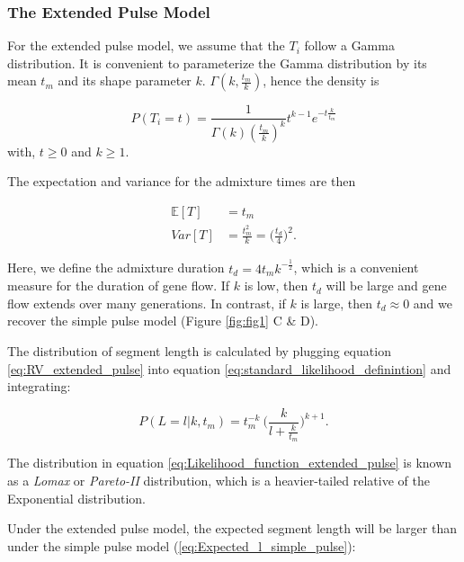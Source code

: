 \documentclass[]{article}
\begin{document}
\subsubsection{The Extended Pulse Model}\label{The Extended Pulse Model}

For the extended pulse model, we assume that the $T_i$ follow a Gamma distribution.  It is convenient to parameterize the Gamma distribution by its mean $t_m$ and its shape parameter $k$.  $\Gamma(k,\frac{t_m}{k})$, hence the density is

\begin{equation}
\label{eq:RV_extended_pulse}
  P(T_i=t)=\frac{1}{\Gamma(k)(\frac{t_m}{k})^k}t^{k-1}e^{-t\frac{k}{t_m}}
\end{equation} 
with, $t \geq 0$ and $k \geq 1$.

The expectation and variance for the admixture times are then

\begin{equation}
\begin{split}
\label{eq:RV_extended_pulse_properties}
\mathbb{E}[T]&=t_{m} \\
Var[T]&=\frac{t_{m}^2}{k} = \bigg(\frac{t_d}{4} \bigg)^2 \text{.}
\end{split}
\end{equation}

Here, we define the admixture duration $t_d=4t_m k^{-\frac{1}{2}} $, which is a convenient measure for the duration of gene flow. If $k$ is low, then $t_d$ will be large and gene flow extends over many generations. In contrast, if $k$ is large, then $t_d \approx 0$ and we recover the simple pulse model (Figure \ref{fig:fig1} C \& D). 


The distribution of segment length is calculated by plugging equation \ref{eq:RV_extended_pulse} into  equation  \ref{eq:standard_likelihood_definintion} and integrating:


\begin{equation}
\label{eq:Likelihood_function_extended_pulse}
    P(L=l | k, t_m) = t_{m}^{-k} \ \Bigg( \frac{k}{l+\frac{k}{t_{m}}}\Bigg)^{k+1} \text{.}
\end{equation}

The distribution  in equation \ref{eq:Likelihood_function_extended_pulse} is known as a \emph{Lomax} or \emph{Pareto-II} distribution, which is a heavier-tailed relative of the Exponential distribution. 


Under the extended pulse model, the expected segment length will be larger than under the simple pulse model (\ref{eq:Expected_l_simple_pulse}):
\end{document}
